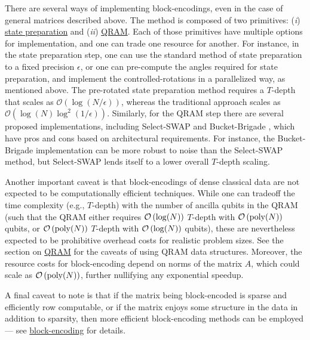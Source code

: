 \begin{refsection}
There are several ways of implementing block-encodings, even in the case of general matrices described above. The method is composed of two primitives: (\emph{i}) \hyperref[prim:StatePrepData]{state preparation} and (\emph{ii}) \hyperref[prim:QRAM]{QRAM}. Each of those primitives have multiple options for implementation, and one can trade one resource for another. For instance, in the state preparation step, one can use the standard method of state preparation to a fixed precision $\epsilon$, or one can pre-compute the angles required for state preparation, and implement the controlled-rotations in a parallelized way, as mentioned above. The pre-rotated state preparation method requires a $T$-depth that scales as $\mathcal{O}(\log(N/\epsilon))$, whereas the traditional approach scales as $\mathcal{O}(\log(N)\log^2(1/\epsilon))$. Similarly, for the QRAM step there are several proposed implementations, including Select-SWAP \cite{low2018tradingTgatesforDirtyQubits} and Bucket-Brigade \cite{giovannetti2007QuantumRAM,hann2021resilienceofQRAM}, which have pros and cons based on architectural requirements. For instance, the Bucket-Brigade implementation can be more robust to noise than the Select-SWAP method, but Select-SWAP lends itself to a lower overall $T$-depth scaling. 

Another important caveat is that block-encodings of dense classical data are not expected to be computationally efficient techniques. While one can tradeoff the time complexity (e.g., $T$-depth) with the number of ancilla qubits in the QRAM (such that the QRAM either requires $\mathcal{O}\left( \log(N) \right)$ $T$-depth with $\mathcal{O}\left( \mathrm{poly}(N) \right)$ qubits, or $\mathcal{O}\left( \mathrm{poly}(N) \right)$ $T$-depth with $\mathcal{O}\left( \log(N) \right)$ qubits), these are nevertheless expected to be prohibitive overhead costs for realistic problem sizes. See the section on \hyperref[prim:QRAM]{QRAM} for the caveats of using QRAM data structures. Moreover, the resource costs for block-encoding depend on norms of the matrix $A$, which could scale as $\mathcal{O}\left( \mathrm{poly}(N) \right)$, further nullifying any exponential speedup.

A final caveat to note is that if the matrix being block-encoded is sparse and efficiently row computable, or if the matrix enjoys some structure in the data in addition to sparsity, then more efficient block-encoding methods can be employed --- see \hyperref[prim:BlockEncodings]{block-encoding} for details.



\end{refsection}

